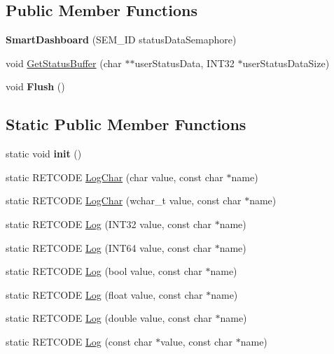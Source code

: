 \subsection*{\-Public \-Member \-Functions}
\begin{DoxyCompactItemize}
\item 
\hypertarget{classSmartDashboard_a8ea30571169aaa8d656765084d14221d}{{\bfseries \-Smart\-Dashboard} (\-S\-E\-M\-\_\-\-I\-D status\-Data\-Semaphore)}\label{classSmartDashboard_a8ea30571169aaa8d656765084d14221d}

\item 
void \hyperlink{classSmartDashboard_aeaa051b9d8715ac4ccb02833c6623a1d}{\-Get\-Status\-Buffer} (char $\ast$$\ast$user\-Status\-Data, \-I\-N\-T32 $\ast$user\-Status\-Data\-Size)
\item 
\hypertarget{classSmartDashboard_a91f1e0d6dbf314a7443b536cb55b1ae8}{void {\bfseries \-Flush} ()}\label{classSmartDashboard_a91f1e0d6dbf314a7443b536cb55b1ae8}

\end{DoxyCompactItemize}
\subsection*{\-Static \-Public \-Member \-Functions}
\begin{DoxyCompactItemize}
\item 
\hypertarget{classSmartDashboard_ae8ea8b62acfb5174bc70185b0e5021de}{static void {\bfseries init} ()}\label{classSmartDashboard_ae8ea8b62acfb5174bc70185b0e5021de}

\item 
static \-R\-E\-T\-C\-O\-D\-E \hyperlink{classSmartDashboard_a2036dedc4a797d69a5982eb9594d4cd7}{\-Log\-Char} (char value, const char $\ast$name)
\item 
static \-R\-E\-T\-C\-O\-D\-E \hyperlink{classSmartDashboard_a04cff49d968f0ac391bb0f94d10ab6b0}{\-Log\-Char} (wchar\-\_\-t value, const char $\ast$name)
\item 
static \-R\-E\-T\-C\-O\-D\-E \hyperlink{classSmartDashboard_a66ec21b3b33082b9fda0203f724009bd}{\-Log} (\-I\-N\-T32 value, const char $\ast$name)
\item 
static \-R\-E\-T\-C\-O\-D\-E \hyperlink{classSmartDashboard_abb3257d3f00cd3fd316c048e1b947c4b}{\-Log} (\-I\-N\-T64 value, const char $\ast$name)
\item 
static \-R\-E\-T\-C\-O\-D\-E \hyperlink{classSmartDashboard_a3da92a382181f248281a8849390004b3}{\-Log} (bool value, const char $\ast$name)
\item 
static \-R\-E\-T\-C\-O\-D\-E \hyperlink{classSmartDashboard_a569006a79c2ec72854e30010eb947c9c}{\-Log} (float value, const char $\ast$name)
\item 
static \-R\-E\-T\-C\-O\-D\-E \hyperlink{classSmartDashboard_ae404f47bce2723a32a46714ce8ebff82}{\-Log} (double value, const char $\ast$name)
\item 
static \-R\-E\-T\-C\-O\-D\-E \hyperlink{classSmartDashboard_ac739e3f781eab8b8e509beff12ac0dbc}{\-Log} (const char $\ast$value, const char $\ast$name)
\end{DoxyCompactItemize}
